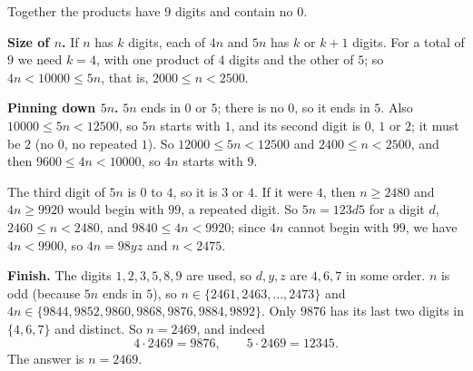 Together the products have $9$ digits and contain no $0$.

\textbf{Size of $n$.} If $n$ has $k$ digits, each of $4n$ and $5n$ has $k$ or $k+1$ digits. For a total of $9$ we need $k=4$, with one product of $4$ digits and the other of $5$; so $4n<10000\le5n$, that is, $2000\le n<2500$.

\textbf{Pinning down $5n$.} $5n$ ends in $0$ or $5$; there is no $0$, so it ends in $5$. Also $10000\le5n<12500$, so $5n$ starts with $1$, and its second digit is $0$, $1$ or $2$; it must be $2$ (no $0$, no repeated $1$). So $12000\le5n<12500$ and $2400\le n<2500$, and then $9600\le4n<10000$, so $4n$ starts with $9$.

The third digit of $5n$ is $0$ to $4$, so it is $3$ or $4$. If it were $4$, then $n\ge2480$ and $4n\ge9920$ would begin with $99$, a repeated digit. So $5n=123d5$ for a digit $d$, $2460\le n<2480$, and $9840\le4n<9920$; since $4n$ cannot begin with $99$, we have $4n<9900$, so $4n=98yz$ and $n<2475$.

\textbf{Finish.} The digits $1,2,3,5,8,9$ are used, so $d,y,z$ are $4,6,7$ in some order. $n$ is odd (because $5n$ ends in $5$), so $n\in\{2461,2463,\dots,2473\}$ and $4n\in\{9844,9852,9860,9868,9876,9884,9892\}$. Only $9876$ has its last two digits in $\{4,6,7\}$ and distinct. So $n=2469$, and indeed
\[
4\cdot2469=9876,\qquad 5\cdot2469=12345 .
\]
The answer is $n=\boxed{2469}$.
